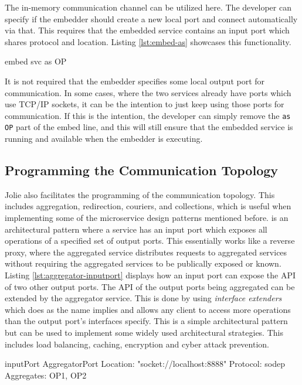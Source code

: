 The in-memory communication channel can be utilized here. The developer can specify if the embedder should create a new local port and connect automatically via that. This requires that the embedded service contains an input port which shares protocol and location.
Listing \ref*{lst:embed-as} showcases this functionality.

\begin{jolisting}[][caption={Embedding of a service called "svc" via a local output port "OP"}, label=lst:embed-as]
embed svc as OP
\end{jolisting}

It is not required that the embedder specifies some local output port for communication. In some cases, where the two services already have ports which use TCP/IP sockets,
it can be the intention to just keep using those ports for communication. If this
is the intention, the developer can simply remove the \texttt{as OP} part of the embed line, and this will still ensure that the embedded service is running and available when the embedder is executing.

\subsection{Programming the Communication Topology}
Jolie also facilitates the programming of the communication topology. This includes aggregation, redirection, couriers, and collections, which is useful when 
implementing some of the microservice design patterns mentioned before.
 is an architectural pattern where a service has an input port which exposes all operations of a specified set of output ports. This essentially works like a reverse proxy, where the aggregated service distributes requests to aggregated services without
requiring the aggregated services to be publically exposed or known. Listing \ref{lst:aggregator-inputport} displays how an input port can expose the API of two other output ports.
The API of the output ports being aggregated can be extended by the aggregator service. This is done by using \textit{interface extenders} which does as the name implies and allows any client to access more operations than the output port's interfaces specify.
This is a simple architectural pattern but can be used to implement some widely used architectural strategies. This includes load balancing, caching, encryption and cyber attack prevention.

\begin{jolisting}[][caption={Input port which aggregates requests to some output ports, OP1 and OP2.}, label=lst:aggregator-inputport]
inputPort AggregatorPort {
    Location: "socket://localhost:8888"
    Protocol: sodep
    Aggregates: OP1, OP2
}
\end{jolisting}

